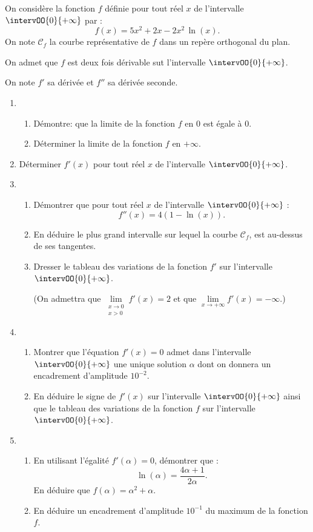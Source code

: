 On considère la fonction $f$ définie pour tout réel $x$ de l'intervalle $\intervOO{0}{+\infty}$ par :%
\[ f(x)=5x^2 + 2x - 2x^2\,\ln(x). \]
%
On note $\mathcal{C}_f$ la courbe représentative de $f$ dans un repère orthogonal du plan.

On admet que $f$ est deux fois dérivable sut l'intervalle $\intervOO{0}{+\infty}$.

On note $f'$ sa dérivée et $f''$ sa dérivée seconde.

\begin{enumerate}
	\item 
	\begin{enumerate}
		\item Démontre: que la limite de la fonction $f$ en 0 est égale à 0.
		\item Déterminer la limite de la fonction $f$ en
		$+\infty$.
	\end{enumerate}
	\item Déterminer $f'(x)$ pour tout réel $x$ de l'intervalle $\intervOO{0}{+\infty}$.
	\item 
	\begin{enumerate}
		\item Démontrer que pour tout réel $x$ de l'intervalle $\intervOO{0}{+\infty}$ :%
		\[ f''(x) = 4(1-\ln(x)). \]
		\item En déduire le plus grand intervalle sur lequel la courbe $\mathcal{C}_f$, est au-dessus de ses tangentes.
		\item Dresser le tableau des variations de la fonction $f'$ sur l'intervalle $\intervOO{0}{+\infty}$.
		
		(On admettra que $\lim\limits_{\substack{x \rightarrow 0 \\ x > 0 }} f'(x) = 2$ et que $\lim\limits_{x \rightarrow +\infty} f'(x) = -\infty$.)
	\end{enumerate}
	\item 
	\begin{enumerate}
		\item Montrer que l'équation $f'(x) = 0$ admet dans l'intervalle $\intervOO{0}{+\infty}$ une unique solution $\alpha$ dont on donnera un encadrement d'amplitude $10^{-2}$.
		\item En déduire le signe de $f'(x)$ sur l'intervalle $\intervOO{0}{+\infty}$ ainsi que le tableau des variations de la fonction $f$ sur l'intervalle $\intervOO{0}{+\infty}$.
	\end{enumerate}
	\item 
	\begin{enumerate}
		\item En utilisant l'égalité $f'(\alpha) = 0$, démontrer que :%
		\[ \ln(\alpha) = \frac{4\alpha+1}{2\alpha}. \]%
		En déduire que $f(\alpha)=\alpha^2+\alpha$.
		\item En déduire un encadrement d'amplitude $10^{-1}$ du maximum de la fonction $f$.
	\end{enumerate}
\end{enumerate}